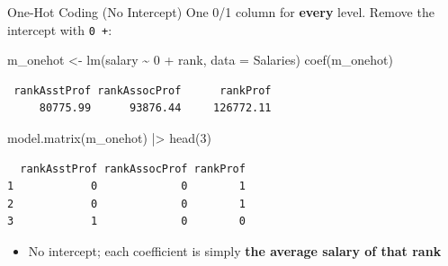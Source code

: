 \documentclass[
  ignorenonframetext,
  aspectratio=169,
]{beamer}
\newenvironment{Shaded}{\begin{snugshade}}{\end{snugshade}}
\newcommand{\AttributeTok}[1]{\textcolor[rgb]{0.40,0.45,0.13}{#1}}
\newcommand{\DecValTok}[1]{\textcolor[rgb]{0.68,0.00,0.00}{#1}}
\newcommand{\FunctionTok}[1]{\textcolor[rgb]{0.28,0.35,0.67}{#1}}
\newcommand{\NormalTok}[1]{\textcolor[rgb]{0.00,0.23,0.31}{#1}}
\newcommand{\OtherTok}[1]{\textcolor[rgb]{0.00,0.23,0.31}{#1}}
\newcommand{\SpecialCharTok}[1]{\textcolor[rgb]{0.37,0.37,0.37}{#1}}
\providecommand{\tightlist}{%
  \setlength{\itemsep}{0pt}\setlength{\parskip}{0pt}}\usepackage{longtable,booktabs,array}
\begin{document}
\begin{frame}[fragile]{One-Hot Coding (No Intercept)}
\protect\hypertarget{sec-onehot}{}
One 0/1 column for \textbf{every} level. Remove the intercept with
\texttt{0\ +}:

\begin{Shaded}
\begin{Highlighting}[]
\NormalTok{m\_onehot }\OtherTok{\textless{}{-}} \FunctionTok{lm}\NormalTok{(salary }\SpecialCharTok{\textasciitilde{}} \DecValTok{0} \SpecialCharTok{+}\NormalTok{ rank, }\AttributeTok{data =}\NormalTok{ Salaries)}
\FunctionTok{coef}\NormalTok{(m\_onehot)}
\end{Highlighting}
\end{Shaded}

\begin{verbatim}
 rankAsstProf rankAssocProf      rankProf 
     80775.99      93876.44     126772.11 
\end{verbatim}

\begin{Shaded}
\begin{Highlighting}[]
\FunctionTok{model.matrix}\NormalTok{(m\_onehot) }\SpecialCharTok{|\textgreater{}} \FunctionTok{head}\NormalTok{(}\DecValTok{3}\NormalTok{)}
\end{Highlighting}
\end{Shaded}

\begin{verbatim}
  rankAsstProf rankAssocProf rankProf
1            0             0        1
2            0             0        1
3            1             0        0
\end{verbatim}

\begin{itemize}
\tightlist
\item
  No intercept; each coefficient is simply \textbf{the average salary of
  that rank}
\end{itemize}
\end{frame}
\end{document}
